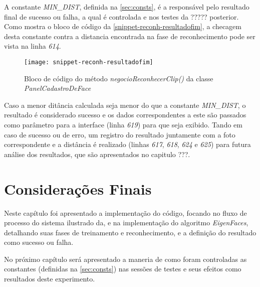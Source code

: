 A constante \textit{MIN\_DIST}, definida na \autoref{sec:consts}, é a responsável pelo resultado final de sucesso ou falha, a qual é controlada e nos testes da ????? posterior. Como mostra o bloco de código da \autoref{snippet-reconh-resultadofim}, a checagem desta constante contra a distancia encontrada na fase de reconhecimento pode ser vista na linha \textit{614}.

\begin{figure}[h]
	\centering
	\texttt{[image: snippet-reconh-resultadofim]}
	\caption{Bloco de código do método \textit{negocioReconhecerClip()} da classe \textit{PanelCadastroDeFace}}
	\label{snippet-reconh-resultadofim}
\end{figure}

Caso a menor ditância calculada seja menor do que a constante \textit{MIN\_DIST}, o resultado é considerado sucesso e os dados correspondentes a este são passados como parâmetro para a interface (linha \textit{619}) para que seja exibido. Tando em caso de sucesso ou de erro, um registro do resultado juntamente com a foto correspondente e a distância é realizado (linhas \textit{617}, \textit{618}, \textit{624} e \textit{625}) para futura análise dos resultados, que são apresentados no capitulo ???.



\section{Considerações Finais}\label{sec:consfin-impl}
Neste capítulo foi apresentado a implementação do código, focando no fluxo de processo do sistema ilustrado da, e na implementação do algoritmo \textit{EigenFaces}, detalhando suas fases de treinamento e reconhecimento, e a definição do resultado como sucesso ou falha.

No próximo capítulo será apresentado a maneria de como foram controladas as constantes (definidas na \autoref{sec:consts}) nas sessões de testes e seus efeitos como resultados deste experimento.



%
